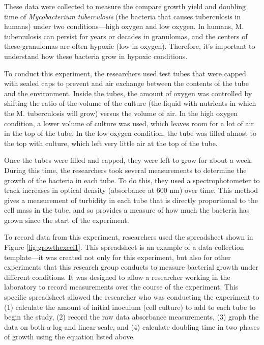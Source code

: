 \documentclass[]{tufte-book}
\begin{document}
These data were collected to measure the compare growth yield and doubling time
of \emph{Mycobacterium tuberculosis} (the bacteria that causes tuberculosis in
humans) under two conditions---high oxygen and low oxygen. In humans, M.
tuberculosis can persist for years or decades in granulomas, and the centers of
these granulomas are often hypoxic (low in oxygen). Therefore, it's important to
understand how these bacteria grow in hypoxic conditions.

To conduct this experiment, the researchers used test tubes that were capped
with sealed caps to prevent and air exchange between the contents of the tube
and the environment. Inside the tubes, the amount of oxygen was controlled
by shifting the ratio of the volume of the culture (the liquid with nutrients
in which the M. tuberculosis will grow) versus the volume of air.
In the high oxygen condition, a lower volume of culture was used, which leaves
room for a lot of air in the top of the tube. In the low oxygen condition,
the tube was filled almost to the top with culture, which left very little air
at the top of the tube.

Once the tubes were filled and capped, they were left to grow for about a week.
During this time, the researchers took several measurements to determine the
growth of the bacteria in each tube. To do this, they used a spectrophotometer
to track increases in optical density (absorbance at 600 nm) over time. This
method gives a measurement of turbidity in each tube that is directly proportional
to the cell mass in the tube, and so provides a measure of how much the
bacteria has grown since the start of the experiment.

To record data from this experiment, researchers used the spreadsheet shown in
Figure \ref{fig:growthexcel1}. This spreadsheet is an example of a data
collection template---it was created not only for this experiment, but also for
other experiments that this research group conducts to measure bacterial growth
under different conditions. It was designed to allow a researcher working in the
laboratory to record measurements over the course of the experiment. This
specific spreadsheet allowed the researcher who was conducting the experiment to
(1) calculate the amount of initial inoculum (cell culture) to add to each tube
to begin the study, (2) record the raw data absorbance measurements, (3) graph
the data on both a log and linear scale, and (4) calculate doubling time in two
phases of growth using the equation listed above.
\end{document}
